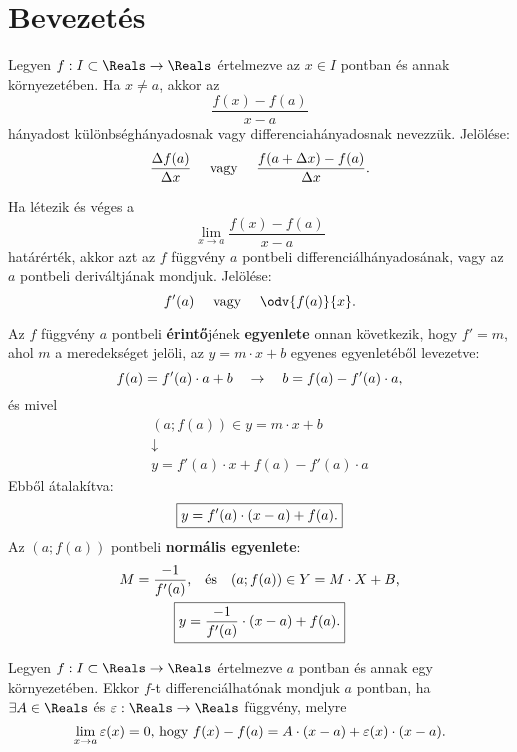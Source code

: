 \section{Bevezetés}\label{section.6.1}

\begin{definition}[Differenciahányados]
  Legyen $f: I \subset \Reals \rightarrow \Reals$ értelmezve az $x \in I$
  pontban és annak környezetében. Ha $x \neq a$, akkor az
  \[
    \frac{f(x) - f(a)}{x - a}
  \]
  hányadost különbséghányadosnak vagy differenciahányadosnak nevezzük.
  Jelölése:
  \[
    \frac{\Delta f(a)}{\Delta x}
    \quad \text{ vagy } \quad
    \frac{f(a + \Delta x) - f(a)}{\Delta x}
    \text.
  \]
\end{definition}

\begin{definition}[Differenciálhányados]
  Ha létezik és véges a
  \[
    \lim_{x \rightarrow a} \frac{f(x) - f(a)}{x - a}
  \]
  határérték, akkor azt az $f$ függvény $a$ pontbeli differenciálhányadosának,
  vagy az $a$ pontbeli deriváltjának mondjuk. Jelölése:
  \[
    f'(a)
    \quad \text{ vagy } \quad
    \odv{f(a)}{x}
    \text.
  \]
\end{definition}

\begin{blueBox}
  Az $f$ függvény $a$ pontbeli \textbf{érintő}jének \textbf{egyenlete} onnan
  következik, hogy $f' = m$, ahol $m$ a meredekséget jelöli, az $y = m \cdot x
    + b$ egyenes egyenletéből levezetve:
  \[
    f(a) = f'(a) \cdot a + b
    \quad \rightarrow \quad
    b = f(a) - f'(a) \cdot a
    \text,
  \]
  és mivel
  \begin{gather*}
    (a; f(a)) \in y = m \cdot x + b
    \\
    \downarrow
    \\
    y = f'(a) \cdot x + f(a) - f'(a) \cdot a
  \end{gather*}
  Ebből átalakítva:
  \[
    \boxed{
      y = f'(a)\cdot (x-a) + f(a)
      \text.
    }
  \]
  Az $(a; f(a))$ pontbeli \textbf{normális egyenlete}:
  \begin{gather*}
    M = \frac{-1}{f'(a)}
    \text, \quad \text{és} \quad
    (a; f(a)) \in Y = M \cdot X + B
    \text,
    \\
    \boxed{
      y = \frac{-1}{f'(a)} \cdot (x-a) + f(a)
      \text.
    }
  \end{gather*}
\end{blueBox}

\begin{definition}[Derivált]
  Legyen $f : I \subset \Reals \rightarrow \Reals$ értelmezve $a$ pontban és
  annak egy környezetében. Ekkor $f$-t differenciálhatónak mondjuk  $a$ pontban,
  ha $\exists A \in \Reals$ és $\varepsilon : \Reals \rightarrow \Reals$
  függvény, melyre
  \[
    \lim\limits_{x\to a} \varepsilon(x) = 0
    \text{, hogy }
    f(x) - f(a) = A \cdot (x-a) + \varepsilon(x)\cdot (x-a)
    \text.
  \]
\end{definition}

